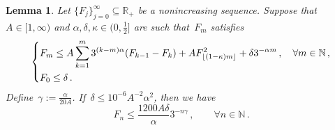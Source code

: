 \documentclass[11pt]{article} %
\numberwithin{equation}{section}
\newtheorem{lemma}[theorem]{Lemma}
\theoremstyle{definition}
\let\originalleft\left
\let\originalright\right
\renewcommand{\left}{\mathopen{}\mathclose\bgroup\originalleft}
\renewcommand{\right}{\aftergroup\egroup\originalright}
\newcommand*{\N}{\ensuremath{\mathbb{N}}}
\newcommand*{\R}{\ensuremath{\mathbb{R}}}
\begin{document}
\begin{lemma} 
\label{l.iteration}
Let $\{ F_j \}_{j=0}^\infty\subseteq\R_+$  be a nonincreasing sequence. 
Suppose that~$A \in [1,\infty)$ and $\alpha,\delta,\kappa \in (0,\tfrac12]$ are such that~$F_m$ satisfies
\begin{equation}
\label{e.Fiter.ass}
\left\{
\begin{aligned}
& F_m \leq A \sum_{k=1}^m 3^{(k-m)\alpha} (F_{k-1} - F_k)  
+  
A F_{\lfloor (1-\kappa) m \rfloor}^2   
+   
\delta 3^{-\alpha m} 
\,, \quad \forall m \in\N\,, 
\\ & 
F_0 \leq \delta 
\,.
\end{aligned}
\right.
\end{equation}
Define~$\gamma := \frac{\alpha}{20A}$. 
If~$\delta \leq 10^{-6} A^{-2} \alpha^2$, then we have
\begin{equation}
\label{e.Fiter.res}
F_n \leq \frac{1200A \delta}{\alpha } 3^{-n\gamma}
\,, \qquad \forall n\in\N
\,.
\end{equation}
\end{lemma}
\end{document}
